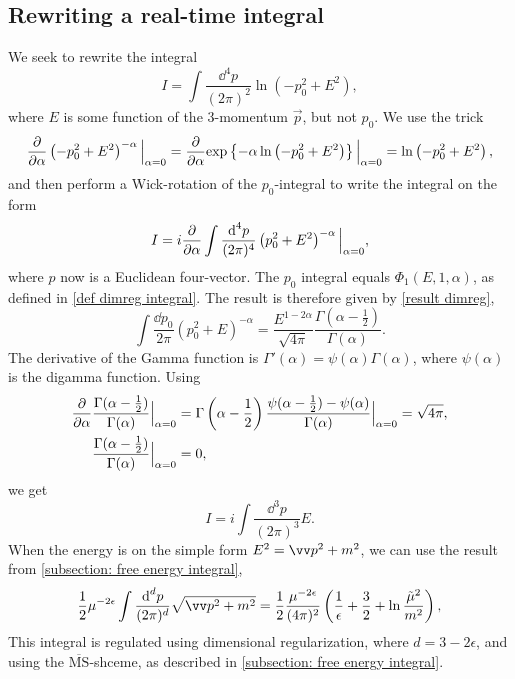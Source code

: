 \subsection{Rewriting a real-time integral}
\label{subsection: rewriting integral}


We seek to rewrite the integral
%
\begin{equation}
    \label{free energy logarithmic integral}
    I = \int \frac{\dd^4 p}{(2 \pi)^2} \ln(-p_0^2 + E^2),
\end{equation}
%
where $E$ is some function of the 3-momentum $\vec p$, but not $p_0$.
We use the trick
%
\begin{equation}
    \pdv{}{\alpha} \left(-p_0^2 + E^2\right)^{-\alpha} \Big|_{\alpha=0}
    = \pdv{}{\alpha} \text{exp} \left\{ -\alpha \ln\left(- p_0^2 + E^2\right) \right\} \Big|_{\alpha=0}
    = \ln\left(- p_0^2 + E^2\right),
\end{equation}
%
and then perform a Wick-rotation of the $p_0$-integral to write the integral on the form 
%
\begin{equation}
    I = i \pdv{}{\alpha} \int \frac{\text{d}^4 p}{(2 \pi)^4} \left(p_0^2 + E^2\right)^{-\alpha} \Big|_{\alpha=0},
\end{equation}
%
where $p$ now is a Euclidean four-vector.
The $p_0$ integral equals $\Phi_1(E, 1, \alpha)$, as defined in \autoref{def dimreg integral}. 
The result is therefore given by \autoref{result dimreg},
%
\begin{equation}
    \int \frac{\dd p_0}{2 \pi} (p_0^2 + E)^{-\alpha} 
    = \frac{E^{1-2\alpha}}{\sqrt{4 \pi}} \frac{\Gamma(\alpha-\frac{1}{2})}{\Gamma(\alpha)}.
\end{equation}
%
The derivative of the Gamma function is $\Gamma'(\alpha) = \psi(\alpha)\Gamma(\alpha)$, where $\psi(\alpha)$ is the digamma function.
Using
%
\begin{align}
    \pdv{}{\alpha} & \frac{\Gamma(\alpha - \frac{1}{2}) }{\Gamma(\alpha)} \Big|_{\alpha=0}
    = \Gamma\left(\alpha - \frac{1}{2}\right) \frac{\psi(\alpha - \frac{1}{2}) - \psi(\alpha)}{\Gamma(\alpha)} \Big|_{\alpha=0}
    = \sqrt{4 \pi}, \\
    & \frac{\Gamma(\alpha - \frac{1}{2}) }{\Gamma(\alpha)}\Big|_{\alpha=0} = 0,
\end{align}
%
we get
%
\begin{equation}
    I = i \int \frac{\dd^3 p}{(2 \pi)^3} E.
\end{equation}
%
When the energy is on the simple form $E^2 = \vv p^2 + m^2$, we can use the result from \autoref{subsection: free energy integral}, 
%
\begin{equation}
    \label{dimreg integral}
    \frac{1}{2} \mu^{-2\epsilon}  \int \frac{\dd^d p}{(2 \pi)^d} \sqrt{\vv p^2 + m^2}
    = \frac{1}{2} \frac{\mu^{-2\epsilon}}{(4 \pi)^2} 
    \left(\frac{1}{\epsilon} + \frac{3}{2} + \ln \frac{\tilde \mu^2}{m^2}\right), 
\end{equation}
%
This integral is regulated using dimensional regularization, where $d = 3 - 2\epsilon $, and using the $\overline{\text{MS}} $-shceme, as described in \autoref{subsection: free energy integral}.